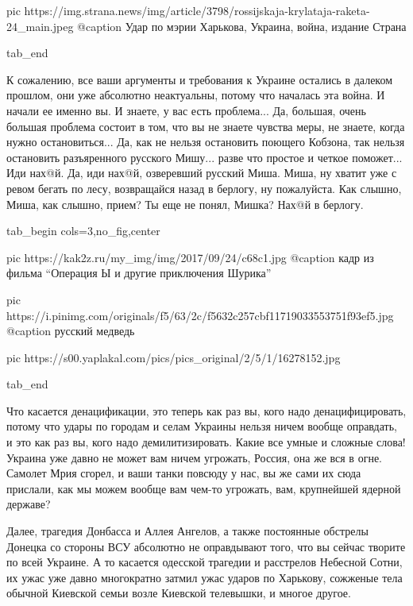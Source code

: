		 pic https://img.strana.news/img/article/3798/rossijskaja-krylataja-raketa-24_main.jpeg
		 @caption Удар по мэрии Харькова, Украина, война, издание Страна

  tab_end
\fi

К сожалению, все ваши аргументы и требования к Украине остались в далеком
прошлом, они уже абсолютно неактуальны, потому что началась эта война. И начали
ее именно вы. И знаете, у вас есть проблема... Да, большая, очень большая
проблема состоит в том, что вы не знаете чувства меры, не знаете, когда нужно
остановиться... Да, как не нельзя остановить поющего Кобзона, так нельзя
остановить разъяренного русского Мишу...  разве что простое и четкое поможет... Иди
нах@й. Да, иди нах@й, озверевший русский Миша. Миша, ну хватит уже с ревом
бегать по лесу, возвращайся назад в берлогу, ну пожалуйста. Как слышно, Миша,
как слышно, прием? Ты еще не понял, Мишка? Нах@й в берлогу.

\ifcmt
  tab_begin cols=3,no_fig,center

     pic https://kak2z.ru/my_img/img/2017/09/24/c68c1.jpg
		 @caption кадр из фильма \enquote{Операция Ы и другие приключения Шурика}

		 pic https://i.pinimg.com/originals/f5/63/2c/f5632c257cbf11719033553751f93ef5.jpg
		 @caption русский медведь

		 pic https://s00.yaplakal.com/pics/pics_original/2/5/1/16278152.jpg

  tab_end
\fi

Что касается денацификации, это теперь как раз вы, кого надо денацифицировать,
потому что удары по городам и селам Украины нельзя ничем вообще оправдать, и
это как раз вы, кого надо демилитизировать. Какие все умные и сложные слова!
Украина уже давно не может вам ничем угрожать, Россия, она же вся в огне.
Самолет Мрия сгорел, и ваши танки повсюду у нас, вы же сами их сюда прислали,
как мы можем вообще вам чем-то угрожать, вам, крупнейшей ядерной державе?

Далее, трагедия Донбасса и Аллея Ангелов, а также постоянные обстрелы Донецка
со стороны ВСУ абсолютно не оправдывают того, что вы сейчас творите по всей
Украине. А то касается одесской трагедии и расстрелов Небесной Сотни, их ужас
уже давно многократно затмил ужас ударов по Харькову, сожженые тела обычной
Киевской семьи возле Киевской телевышки, и многое другое.
